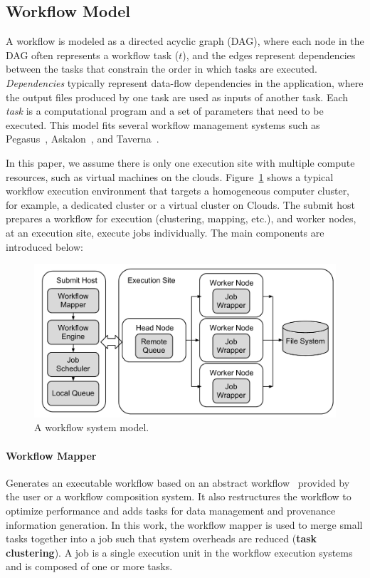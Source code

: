 \documentclass{IOS-Book-Article}
\begin{document}
\subsection{Workflow Model}


\label{sec:model}


A workflow is modeled as a directed acyclic graph (DAG), where each node in the DAG often represents a workflow task ($t$), and the edges represent dependencies between the tasks that constrain the order in which tasks are executed. \emph{Dependencies} typically represent data-flow dependencies in the application, where the output files produced by one task are used as inputs of another task. Each \emph{task} is a computational program and a set of parameters that need to be executed. 
This model fits several workflow management systems such as Pegasus~\cite{Deelman2004}, Askalon~\cite{fahringer2007askalon}, and Taverna~\cite{Oinn2004}. 

In this paper, we assume there is only one execution site with multiple compute resources, such as virtual machines on the clouds. 
Figure~\ref{fig:model_system} shows a typical workflow execution environment that targets a homogeneous computer cluster, for example, a dedicated cluster or a virtual cluster on Clouds. The submit host prepares a workflow for execution (clustering, mapping, etc.), and worker nodes, at an execution site, execute jobs individually. The main components are introduced below:

\begin{figure}[!htb]
\centering
  \includegraphics[width=0.95\linewidth]{model.pdf}
  \caption{A workflow system model.}
  \label{fig:model_system}
\end{figure}

\paragraph{Workflow Mapper} Generates an executable workflow based on an abstract workflow~\cite{Deelman2004} provided by the user or a workflow composition system. It also restructures the workflow to optimize performance and adds tasks for data management and provenance information generation. In this work, the workflow mapper is used to merge small tasks together into a job such that system overheads are reduced (\textbf{task clustering}). A job is a single execution unit in the workflow execution systems and is composed of one or more tasks. 
\end{document}
